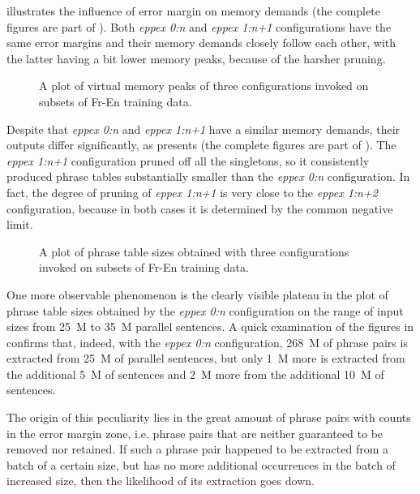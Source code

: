  illustrates the influence of error margin on \eppex{} memory demands
(the complete figures are part of ).
Both \emph{eppex 0:n} and \emph{eppex 1:n+1} configurations have the same error margins and
their memory demands closely follow each other, with the latter having a bit lower memory
peaks, because of the harsher pruning.

\begin{figure}[!htb]
  \centering
  
  \caption{
    A plot of virtual memory peaks of three \eppex{} configurations invoked on subsets of Fr-En training data.
  }
  \label{fig:fr-en-vm-peaks}
\end{figure}

Despite that \emph{eppex 0:n} and \emph{eppex 1:n+1} have a similar memory demands, their outputs
differ significantly, as  presents (the complete figures are part
of ).
The \emph{eppex 1:n+1} configuration pruned off all the singletons, so it consistently
produced phrase tables substantially smaller than the \emph{eppex 0:n} configuration.
In fact, the degree of pruning of \emph{eppex 1:n+1} is very close to the \emph{eppex 1:n+2} configuration,
because in both cases it is determined by the common negative limit.

\begin{figure}[!htb]
  \centering
  
  \caption{
    A plot of phrase table sizes obtained with three \eppex{} configurations invoked on subsets of Fr-En training data.
  }
  \label{fig:fr-en-phrase-table-sizes}
\end{figure}

One more observable phenomenon is the clearly visible plateau in the plot of phrase table sizes
obtained by the \emph{eppex 0:n} configuration on the range of input sizes from 25~M to 35~M parallel sentences.
A quick examination of the figures in  confirms that, indeed, with
the \emph{eppex 0:n} configuration, 268~M of phrase pairs is extracted from 25~M of parallel sentences,
but only 1~M more is extracted from the additional 5~M of sentences and 2~M more from the additional
10~M of sentences.

The origin of this peculiarity lies in the great amount of phrase pairs with counts in the error
margin zone, i.e. phrase pairs that are neither guaranteed to be removed nor retained.
If such a phrase pair happened to be extracted from a batch of a certain size, but has no more
additional occurrences in the batch of increased size, then the likelihood of its extraction
goes down.

